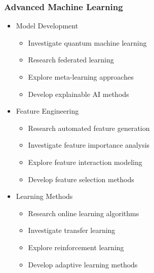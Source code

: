 \documentclass[conference]{IEEEtran}
\begin{document}
\subsubsection{Advanced Machine Learning}
\begin{itemize}
    \item Model Development
    \begin{itemize}
        \item Investigate quantum machine learning
        \item Research federated learning
        \item Explore meta-learning approaches
        \item Develop explainable AI methods
    \end{itemize}
    
    \item Feature Engineering
    \begin{itemize}
        \item Research automated feature generation
        \item Investigate feature importance analysis
        \item Explore feature interaction modeling
        \item Develop feature selection methods
    \end{itemize}
    
    \item Learning Methods
    \begin{itemize}
        \item Research online learning algorithms
        \item Investigate transfer learning
        \item Explore reinforcement learning
        \item Develop adaptive learning methods
    \end{itemize}
\end{itemize}
\end{document}
